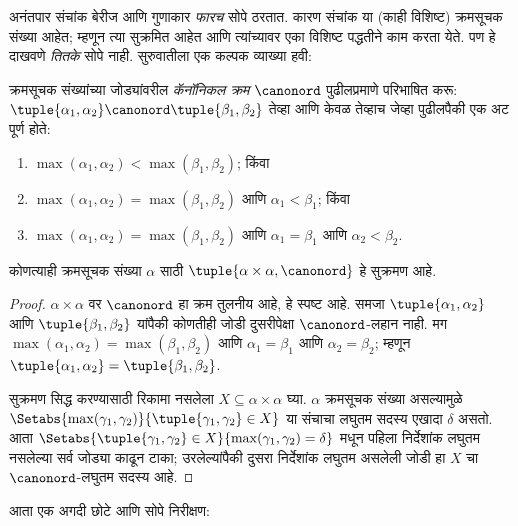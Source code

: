 \documentclass[../../../include/open-logic-section]{subfiles}
\begin{document}


अनंतपार संचांक बेरीज आणि गुणाकार \emph{फारच} सोपे ठरतात. कारण संचांक या (काही विशिष्ट) क्रमसूचक संख्या आहेत; म्हणून त्या सुक्रमित आहेत आणि त्यांच्यावर एका विशिष्ट पद्धतीने काम करता येते. पण हे दाखवणे \emph{तितके} सोपे नाही. सुरुवातीला एक कल्पक व्याख्या हवी:

\begin{defn}
क्रमसूचक संख्यांच्या जोड्यांवरील \emph{कॅनॉनिकल क्रम} $\canonord$ पुढीलप्रमाणे परिभाषित करू: $\tuple{\alpha_1, \alpha_2} \canonord
\tuple{\beta_1, \beta_2}$ तेव्हा आणि केवळ तेव्हाच जेव्हा पुढीलपैकी एक अट पूर्ण होते:
\begin{enumerate}
  \item $\max(\alpha_1, \alpha_2) < \max(\beta_1, \beta_2)$; किंवा
  \item $\max(\alpha_1, \alpha_2) = \max(\beta_1, \beta_2)$ आणि
  $\alpha_1 < \beta_1$; किंवा
  \item $\max(\alpha_1, \alpha_2) = \max(\beta_1, \beta_2)$ आणि
  $\alpha_1 = \beta_1$ आणि $\alpha_2 < \beta_2$.
\end{enumerate}
\end{defn}

\begin{lem}
कोणत्याही क्रमसूचक संख्या $\alpha$ साठी $\tuple{\alpha \times \alpha, \canonord}$ हे सुक्रमण आहे.
\end{lem}

\begin{proof}
$\alpha \times \alpha$ वर $\canonord$ हा क्रम तुलनीय आहे, हे स्पष्ट आहे. समजा $\tuple{\alpha_1, \alpha_2}$ आणि $\tuple{\beta_1,
\beta_2}$ यांपैकी कोणतीही जोडी दुसरीपेक्षा $\canonord$-लहान नाही. मग $\max(\alpha_1,
\alpha_2) = \max(\beta_1, \beta_2)$ आणि $\alpha_1 = \beta_1$ आणि
$\alpha_2 = \beta_2$; म्हणून $\tuple{\alpha_1, \alpha_2} =
\tuple{\beta_1,  \beta_2}$.

सुक्रमण सिद्ध करण्यासाठी रिकामा नसलेला $X \subseteq \alpha\times\alpha$ घ्या. $\alpha$ क्रमसूचक संख्या असल्यामुळे
$\Setabs{\max(\gamma_1, \gamma_2)}{\tuple{\gamma_1,
\gamma_2} \in X}$ या संचाचा लघुतम सदस्य एखादा $\delta$ असतो. आता
$\Setabs{\tuple{\gamma_1,\gamma_2} \in X}{\max(\gamma_1, \gamma_2) =
\delta}$ मधून पहिला निर्देशांक लघुतम नसलेल्या सर्व जोड्या काढून टाका; उरलेल्यांपैकी दुसरा निर्देशांक लघुतम असलेली जोडी हा $X$ चा $\canonord$-लघुतम सदस्य आहे.
\end{proof}
\noindent
आता एक अगदी छोटे आणि सोपे निरीक्षण:
\end{document}
